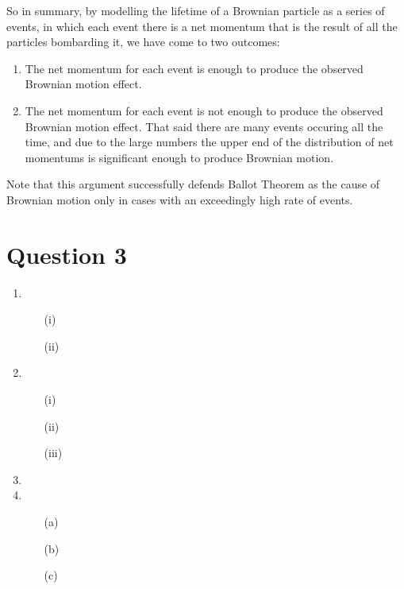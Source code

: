 \documentclass[10pt,a4paper]{article}
\begin{document}
\begin{itemize}
	So in summary, by modelling the lifetime of a Brownian particle as a series of events, in which each event there is a net momentum that is the result of all the particles bombarding it, we have come to two outcomes:
		\begin{enumerate}
			\item The net momentum for each event is enough to produce the observed Brownian motion effect.
			\item The net momentum for each event is not enough to produce the observed Brownian motion effect. That said there are many events occuring all the time, and due to the large numbers the upper end of the distribution of net momentums is significant enough to produce Brownian motion.
		\end{enumerate}

	Note that this argument successfully defends Ballot Theorem as the cause of Brownian motion only in cases with an exceedingly high rate of events.
\end{itemize}

\section*{Question 3}

\begin{enumerate}
	\item 
		\begin{itemize}
			\item[(i)]
			\item[(ii)]
		\end{itemize}
	\item
		\begin{itemize}
			\item[(i)]
			\item[(ii)]
			\item[(iii)]
		\end{itemize}
	\item
	\item
		\begin{itemize}
			\item[(a)]
			\item[(b)]
			\item[(c)]
		\end{itemize}
\end{enumerate}
\end{document}
